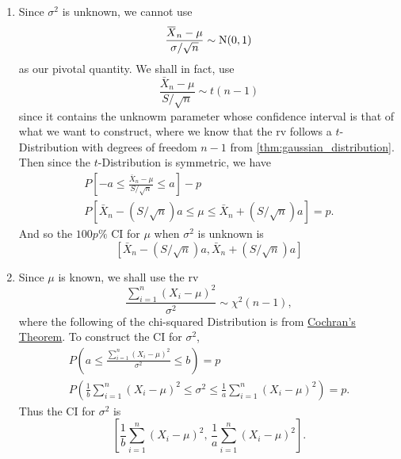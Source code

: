 \documentclass[notoc,notitlepage]{tufte-book}
\begin{document}
\begin{solution}
  \begin{enumerate}
    \item Since $\sigma^2$ is unknown, we cannot use
      \begin{equation*}
        \frac{\bar{X}_n - \mu}{\sigma / \sqrt{n}} \sim \Nor(0, 1)
      \end{equation*}
      as our pivotal quantity. We shall in fact, use
      \begin{equation*}
        \frac{\bar{X}_n - \mu}{S / \sqrt{n}} \sim t(n - 1)
      \end{equation*}
      since it contains the unknowm parameter whose confidence interval is that of what we want to construct, where we know that the rv follows a $t$-Distribution with degrees of freedom $n - 1$ from \cref{thm:gaussian_distribution}. Then since the $t$-Distribution is symmetric, we have
      \begin{gather*}
        P\left[ -a \leq \frac{\bar{X}_n - \mu}{S / \sqrt{n}} \leq a \right] - p \\
        P\left[ \bar{X}_n - (S / \sqrt{n}) a \leq \mu \leq \bar{X}_n + (S / \sqrt{n}) a \right] = p.
      \end{gather*}
      And so the $100p\%$ CI for $\mu$ when $\sigma^2$ is unknown is
      \begin{equation*}
        \left[ \bar{X}_n - (S / \sqrt{n}) a , \bar{X}_n + (S / \sqrt{n}) a \right]
      \end{equation*}

    \item Since $\mu$ is known, we shall use the rv
      \begin{equation*}
        \frac{\sum\limits_{i=1}^{n} (X_i - \mu)^2}{\sigma^2} \sim \chi^2 (n - 1),
      \end{equation*}
      where the following of the chi-squared Distribution is from \hyperref[thm:gaussian_distribution]{Cochran's Theorem}. To construct the CI for $\sigma^2$,
      \begin{gather*}
        P\left(a \leq \frac{\sum\limits_{i=1}^{n} (X_i - \mu)^2}{\sigma^2} \leq b\right) = p \\
        P\left( \frac{1}{b} \sum_{i=1}^{n} (X_i - \mu)^2 \leq \sigma^2 \leq \frac{1}{a} \sum_{i=1}^{n} (X_i - \mu)^2 \right) = p.
      \end{gather*}
      Thus the CI for $\sigma^2$ is
      \begin{equation*}
        \left[ \frac{1}{b} \sum_{i=1}^{n} (X_i - \mu)^2, \, \frac{1}{a} \sum_{i=1}^{n} (X_i - \mu)^2 \right].
      \end{equation*}
  \end{enumerate}
\end{solution}
\end{document}
